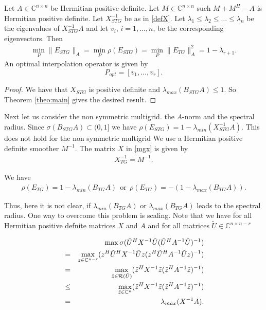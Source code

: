 \documentclass[final]{siamltex}
\newcommand{\innCnmr}{\in\mathbb{C}^{n-r}}
\newcommand{\beqo}{\begin{eqnarray*}}
\newcommand{\beq}{\begin{eqnarray}}
\newcommand{\eeqo}{\end{eqnarray*}}
\newcommand{\eeq}{\end{eqnarray}}
\numberwithin{equation}{section}
\newcommand{\ran} {{\cal R}}
\newcommand{\bCn}{\mathbb{C}^n}
\newcommand{\Cnnr}{\mathbb{C}^{n \times n-r}}
\newcommand{\inCnn}{\in \mathbb{C}^{n \times n}}
\begin{document}
\begin{corollary} \label{coro:one}
Let  $A\inCnn$  be Hermitian positive definite. Let $ M \inCnn$ such $M + M^H -
A$ is Hermitian positive definite.
Let $X_{STG}^{-1}$  be as in \eqref{defX}.  
 Let $
\lambda_1 \leq \lambda_2 \leq \ldots \leq  \lambda_n $
be the  eigenvalues of $X_{STG}^{-1}A$  and let $v_i$, $i = 1, \ldots, n$, be
the corresponding eigenvectors. Then
\beq
\min_{P} \|E_{STG}\|_A = \min_{P}\rho(E_{STG}) =  \min_{P}\|E_{TG}\|_A^2 = 1 -
\lambda_{r+1}.
\eeq
An optimal interpolation operator is given by 
\[
P_{opt} = [v_{1}, \ldots , v_r].
\]
\end{corollary}
\begin{proof}
We have  that $X_{STG}$ is positive definite and $\lambda_{max}(B_{STG}A) \leq
1$. So Theorem \ref{theo:main} gives the desired result.
\end{proof}

Next  let us consider  the non symmetric  multigrid. 
the $A$-norm and the spectral radius. Since $\sigma(B_{STG}A) \subset (0,1]$
we have   $\rho(E_{STG}) = 1 - \lambda_{min}(X_{STG}^{-1}A)$. This does not
hold for the non symmetric multigrid
We use a Hermitian positive  definite smoother $M^{-1}$. The matrix $X$ in
\eqref{mgx} is given by
\beq \label{defXtg}
X^{-1}_{TG} = M^{-1}.
\eeq

We have
\beqo
\rho(E_{TG}) = 1 - \lambda_{min}(B_{TG}A)
\ \  \mbox{or} \ \ 
\rho(E_{TG}) = -(1 - \lambda_{max}(B_{TG}A)).
\eeqo

Thus, here it is not clear, if $\lambda_{min}(B_{TG}A)$ or
$\lambda_{max}(B_{TG}A)$  leads to the spectral radius.
One way to overcome  this problem is scaling. Note that we  have for all
Hermitian positive defnite matrices $X$ and $A$ and for all matrices $\tilde U
\in \Cnnr$


\beqo
& &  \max \sigma(\tilde U^HX^{-1}\tilde U (\tilde U^HA^{-1}\tilde U)^{-1})\\
& = &  \max_{z \innCnmr} (z^H\tilde U^HX^{-1}\tilde Uz (z^H\tilde
U^HA^{-1}\tilde Uz)^{-1})\\
& = &  \max_{\tilde z \in {\ran (\tilde U)} } (\tilde z^HX^{-1}\tilde z (\tilde
z^HA^{-1}\tilde z)^{-1})\\
& \leq & \max_{\tilde z \in \bCn } (\tilde z^HX^{-1}\tilde z (\tilde
z^HA^{-1}\tilde z)^{-1})\\
& = & \lambda_{max}(X^{-1}A).
\eeqo
\end{document}
